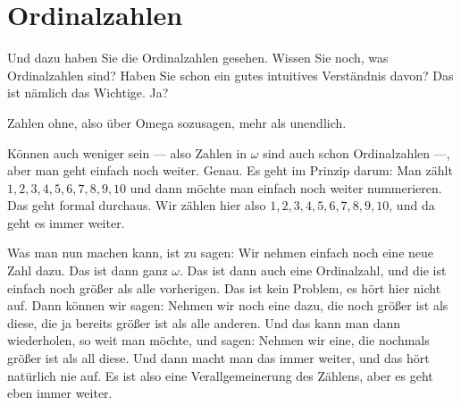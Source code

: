 \begin{ai-global-state-checkpoint-invisible-content}
\end{ai-global-state-checkpoint-invisible-content}

\section{Ordinalzahlen}

\begin{spoken-clean}[00:05:30 - 00:05:45]
Und dazu haben Sie die Ordinalzahlen gesehen. Wissen Sie noch, was Ordinalzahlen sind? Haben Sie schon ein gutes intuitives Verständnis davon? Das ist nämlich das Wichtige. Ja?
\end{spoken-clean}

\begin{student-interaction}[Studentenantwort]
Zahlen ohne, also über Omega sozusagen, mehr als unendlich.
\end{student-interaction}

\begin{spoken-clean}[00:05:50 - 00:07:15]
Können auch weniger sein --- also Zahlen in $\omega$ sind auch schon Ordinalzahlen ---, aber man geht einfach noch weiter. Genau. Es geht im Prinzip darum: Man zählt $1, 2, 3, 4, 5, 6, 7, 8, 9, 10$ und dann möchte man einfach noch weiter nummerieren. Das geht formal durchaus. Wir zählen hier also $1, 2, 3, 4, 5, 6, 7, 8, 9, 10$, und da geht es immer weiter.

Was man nun machen kann, ist zu sagen: Wir nehmen einfach noch eine neue Zahl dazu. Das ist dann ganz $\omega$. Das ist dann auch eine Ordinalzahl, und die ist einfach noch größer als alle vorherigen. Das ist kein Problem, es hört hier nicht auf. Dann können wir sagen: Nehmen wir noch eine dazu, die noch größer ist als diese, die ja bereits größer ist als alle anderen. Und das kann man dann wiederholen, so weit man möchte, und sagen: Nehmen wir eine, die nochmals größer ist als all diese. Und dann macht man das immer weiter, und das hört natürlich nie auf. Es ist also eine Verallgemeinerung des Zählens, aber es geht eben immer weiter.
\end{spoken-clean}

